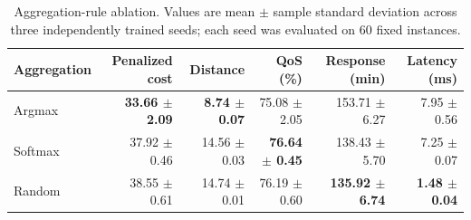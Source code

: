 \begin{table}[t]
\centering
\caption{Aggregation-rule ablation. Values are mean $\pm$ sample standard deviation across three independently trained seeds; each seed was evaluated on 60 fixed instances.}
\label{tab:aggregation-ablation}
\begin{tabular}{lrrrrr}
\hline
Aggregation & Penalized cost & Distance & QoS (\%) & Response (min) & Latency (ms) \\
\hline
Argmax  & \textbf{33.66 $\pm$ 2.09} & \textbf{8.74 $\pm$ 0.07} & 75.08 $\pm$ 2.05 & 153.71 $\pm$ 6.27 & 7.95 $\pm$ 0.56 \\
Softmax & 37.92 $\pm$ 0.46 & 14.56 $\pm$ 0.03 & \textbf{76.64 $\pm$ 0.45} & 138.43 $\pm$ 5.70 & 7.25 $\pm$ 0.07 \\
Random  & 38.55 $\pm$ 0.61 & 14.74 $\pm$ 0.01 & 76.19 $\pm$ 0.60 & \textbf{135.92 $\pm$ 6.74} & \textbf{1.48 $\pm$ 0.04} \\
\hline
\end{tabular}
\end{table}
